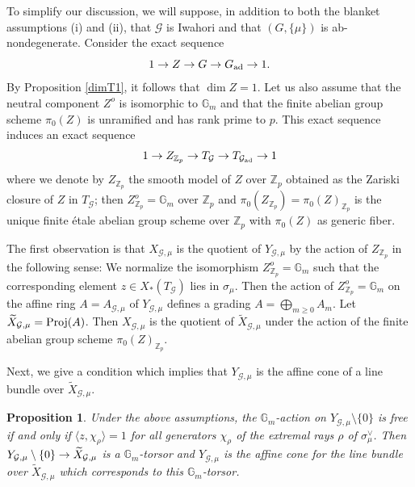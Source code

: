 \documentclass[reqno, 10pt]{amsart}
\makeatletter
\newcommand{\BG}{\ensuremath{\mathbb {G}}\xspace}
\newcommand{\BZ}{\ensuremath{\mathbb {Z}}\xspace}
\newcommand{\CG}{\ensuremath{\mathcal {G}}\xspace}
\newcommand{\ad}{{\mathrm{ad}}}
\newcommand{\wt}{\widetilde}
\newtheorem{proposition}[subsubsection]{Proposition}
\theoremstyle{definition}
\numberwithin{equation}{subsection}
\numberwithin{subsubsection}{subsection}
\renewcommand{\to}{%
   \ifbool{@display}{\longrightarrow}{\rightarrow}%
   }
\makeatother
\begin{document}
 To simplify our discussion, we will suppose, in addition to both the blanket assumptions (i) and (ii), that $\CG$ is Iwahori and that $(G,\{\mu\})$ is ab-nondegenerate. Consider the exact sequence
\[
1\to Z\to G\to G_\ad\to 1 .
\]
By Proposition \ref{dimT1}, it follows that $\dim Z=1$. Let us also assume that the neutral component $Z^o$ is isomorphic to $\BG_m$ and that the finite abelian group scheme $\pi_0(Z)$ is unramified and has rank prime to $p$. This exact sequence induces an exact sequence 
\begin{equation}
1\to Z_{\BZ_p}\to T_\CG\to T_{\CG_\ad}\to 1 
\end{equation}
where we denote by $Z_{\BZ_p}$ the smooth model of $Z$ over $\BZ_p$ obtained 
as the Zariski closure of $Z$ in $T_\CG$; then $Z^o_{\BZ_p}= \BG_m$ over $\BZ_p$ and   $\pi_0(Z_{\BZ_p})=\pi_0(Z)_{\BZ_p}$ is the unique finite \'etale abelian group scheme over $\BZ_p$ with  $\pi_0(Z)$
as generic fiber.

The first observation is that $X_{\CG, \mu}$ is the quotient of $Y_{\CG, \mu}$ by the action of $Z_{\BZ_p}$ in the following sense: We normalize the isomorphism $Z^o_{\BZ_p}=\BG_m$ such that the corresponding element $z\in X_*(T_\CG)$ lies in $\sigma_{\mu}$. Then the action of $Z^o_{\BZ_p}=\BG_m$ on the affine ring $A=A_{\CG, \mu}$ of $Y_{\CG, \mu}$ defines a grading $A=\bigoplus_{m\geq 0} A_m$.   Let $\wt X_{\CG, \mu}={\rm Proj} (A)$. Then $X_{\CG, \mu}$  is the quotient of $\wt X_{\CG, \mu}$ under the action of the finite abelian group scheme
$\pi_0(Z)_{\BZ_p}$. 


Next, we give a condition which implies that $Y_{\CG,\mu}$ is the affine cone of a line bundle over $\wt X_{\CG,\mu}$. 

 
  \begin{proposition}\label{prop:free} Under the above assumptions, the $\BG_m$-action on $Y_{\CG, \mu}\setminus \{0\}$ is free if and only if $\langle z, \chi_\rho\rangle=1$ for all generators $\chi_\rho$ of the extremal rays $\rho$ of $\sigma^\vee_\mu$.  Then $Y_{\CG, \mu}\setminus \{0\}\to \wt X_{\CG, \mu}$ is a $\BG_m$-torsor and
  $Y_{\CG, \mu}$ is the affine cone for the  line bundle over $\wt X_{\CG, \mu}$
  which corresponds to this $\BG_m$-torsor.  
  \end{proposition}
  
\end{document}
